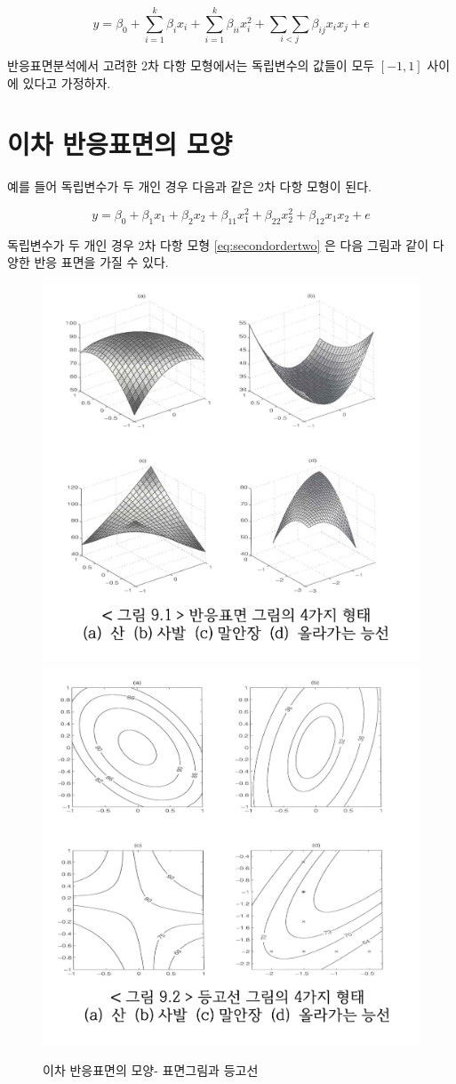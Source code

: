 \documentclass[
]{book}
\makeatletter
\newenvironment{kframe}{%
\medskip{}
\setlength{\fboxsep}{.8em}
 \def\at@end@of@kframe{}%
 \ifinner\ifhmode%
  \def\at@end@of@kframe{\end{minipage}}%
  \begin{minipage}{\columnwidth}%
 \fi\fi%
 \def\FrameCommand##1{\hskip\@totalleftmargin \hskip-\fboxsep
 \colorbox{shadecolor}{##1}\hskip-\fboxsep
     \hskip-\linewidth \hskip-\@totalleftmargin \hskip\columnwidth}%
 \MakeFramed {\advance\hsize-\width
   \@totalleftmargin\z@ \linewidth\hsize
   \@setminipage}}%
 {\par\unskip\endMakeFramed%
 \at@end@of@kframe}
\newenvironment{rmdblock}[1]
  {
  \begin{itemize}
  \renewcommand{\labelitemi}{
    \raisebox{-.7\height}[0pt][0pt]{
      {\setkeys{Gin}{width=3em,keepaspectratio}\texttt{[image: images/\#1]}}
    }
  }
  \setlength{\fboxsep}{1em}
  \begin{kframe}
  \item
  }
  {
  \end{kframe}
  \end{itemize}
  }
\newenvironment{rmdnote}
  {\begin{rmdblock}{note}}
  {\end{rmdblock}}
\theoremstyle{definition}
\theoremstyle{definition}
\theoremstyle{definition}
\theoremstyle{definition}
\theoremstyle{remark}
\makeatother
\begin{document}
\begin{equation}
y = \beta_0 + \sum_{i=1}^{k} \beta_i x_i + \sum_{i=1}^{k} \beta_{ii} x^2_i + \underset{i<j}{\sum \sum} \beta_{ij} x_i x_j +e
\label{eq:secondorder}
\end{equation}

\begin{rmdnote}
반응표면분석에서 고려한 2차 다항 모형에서는 독립변수의 값들이 모두 \([-1,1]\) 사이에 있다고 가정하자.
\end{rmdnote}

\hypertarget{uxc774uxcc28-uxbc18uxc751uxd45cuxba74uxc758-uxbaa8uxc591}{%
\section{이차 반응표면의 모양}\label{uxc774uxcc28-uxbc18uxc751uxd45cuxba74uxc758-uxbaa8uxc591}}

예를 들어 독립변수가 두 개인 경우 다음과 같은 2차 다항 모형이 된다.

\begin{equation}
y = \beta_0 + \beta_1 x_1  + \beta_2 x_2 + \beta_{11} x_1^2 + \beta_{22} x_2^2 + \beta_{12} x_1 x_2 + e
\label{eq:secondordertwo}
\end{equation}

독립변수가 두 개인 경우 2차 다항 모형 \eqref{eq:secondordertwo} 은 다음 그림과 같이 다양한 반응 표면을 가질 수 있다.

\begin{figure}

{\centering \includegraphics[width=0.5\linewidth]{myimages/response-03} \includegraphics[width=0.5\linewidth]{myimages/response-04} 

}

\caption{이차 반응표면의 모양- 표면그림과 등고선}\label{fig:plot3}
\end{figure}
\end{document}
